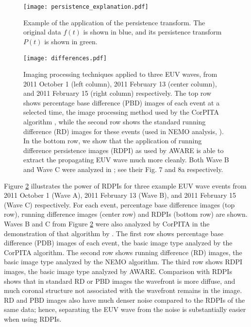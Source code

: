 \begin{figure}
\begin{center}
\texttt{[image: persistence\_explanation.pdf]}
\caption{Example of the application of the persistence transform.  The
original data $f(t)$ is shown in blue, and its persistence transform
$P(t)$ is shown in green.}
\label{fig:persistence}
\end{center}
\end{figure}

\begin{figure}
\begin{center}
\texttt{[image: differences.pdf]}
\caption{Imaging processing techniques applied to three EUV waves,
  from 2011 October 1 (left column), 2011 February 13 (center column),
  and 2011 February 15 (right column) respectively. The top row shows
  percentage base difference (PBD) images of each event at a selected
  time, the image processing method used by the CorPITA algorithm
  \citep{2014SoPh..289.3279L}, while the second row shows the standard running
  difference (RD) images for these events (used in NEMO analysis,
  \citep{2005SoPh..228..265P}). In the bottom row, we show that the
  application of running difference persistence images (RDPI) as used
  by AWARE is able to extract the propagating EUV wave much more
  cleanly. Both Wave B and Wave C were analyzed in
  \cite{2014SoPh..289.3279L}; see their Fig. 7 and 8a respectively.}
\label{rpdm_figure}
\end{center}
\end{figure}

Figure \ref{rpdm_figure} illustrates the power of RDPIs for three
example EUV wave events from 2011 October 1 (Wave A), 2011 February 13
(Wave B), and 2011 February 15 (Wave C) respectively. For each event,
percentage base difference images (top row), running difference images
(center row) and RDPIs (bottom row) are shown. Waves B and C from
Figure \ref{rpdm_figure} were also analyzed by CorPITA in the
demonstration of that algorithm by \citet{2014SoPh..289.3279L}.  The
first row shows percentage base difference (PDB) images of each event,
the basic image type analyzed by the CorPITA algorithm.  The second
row shows running difference (RD) images, the basic image type
analyzed by the NEMO algorithm.  The third row shows RDPI images, the
basic image type analyzed by AWARE. Comparison with RDPIs shows that
in standard RD or PBD images the wavefront is more diffuse, and much
coronal structure not associated with the wavefront remains in the
image. RD and PBD images also have much denser noise compared to the
RDPIs of the same data; hence, separating the EUV wave from the noise
is substantially easier when using RDPIs.

